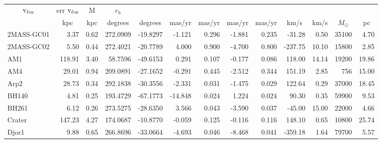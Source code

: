 \begin{longtable}{ | l | r | r| r | r | r | r | r | r | r | r | r | r  |}
            \multicolumn{1}{|c|}{$\rm v_{\ell os}$  } & 
            \multicolumn{1}{|c|}{err $\rm v_{\ell os}$} & 
            \multicolumn{1}{|c|}{M         } & 
            \multicolumn{1}{|c|}{$r_{h}$ } \\ 
            \multicolumn{1}{|c|}{}& 
            \multicolumn{1}{|c|}{kpc       } & 
            \multicolumn{1}{|c|}{kpc       } & 
            \multicolumn{1}{|c|}{degrees   } & 
            \multicolumn{1}{|c|}{degrees   } & 
            \multicolumn{1}{|c|}{mas/yr    } & 
            \multicolumn{1}{|c|}{mas/yr    } & 
            \multicolumn{1}{|c|}{mas/yr    } & 
            \multicolumn{1}{|c|}{mas/yr    } & 
            \multicolumn{1}{|c|}{km/s      } & 
            \multicolumn{1}{|c|}{km/s      } & 
            \multicolumn{1}{|c|}{$M_{\odot}$} & 
            \multicolumn{1}{|c|}{pc        } \\ 
            \hline
            \endhead
            \hline
            \endfoot
            2MASS-GC01    &   3.37 & 0.62 & 272.0909 & -19.8297 &  -1.121 & 0.296 &  -1.881 &  0.235 &  -31.28 &  0.50 &   35100 &  4.70\\ 
            2MASS-GC02    &   5.50 & 0.44 & 272.4021 & -20.7789 &   4.000 & 0.900 &  -4.700 &  0.800 & -237.75 & 10.10 &   15800 &  2.85\\ 
            AM1           & 118.91 & 3.40 &  58.7596 & -49.6153 &   0.291 & 0.107 &  -0.177 &  0.086 &  118.00 & 14.14 &   19200 & 19.86\\ 
            AM4           &  29.01 & 0.94 & 209.0891 & -27.1652 &  -0.291 & 0.445 &  -2.512 &  0.344 &  151.19 &  2.85 &     756 & 15.00\\ 
            Arp2          &  28.73 & 0.34 & 292.1838 & -30.3556 &  -2.331 & 0.031 &  -1.475 &  0.029 &  122.64 &  0.29 &   37000 & 18.45\\ 
            BH140         &   4.81 & 0.25 & 193.4729 & -67.1773 & -14.848 & 0.024 &   1.224 &  0.024 &   90.30 &  0.35 &   59900 &  9.53\\ 
            BH261         &   6.12 & 0.26 & 273.5275 & -28.6350 &   3.566 & 0.043 &  -3.590 &  0.037 &  -45.00 & 15.00 &   22000 &  4.66\\ 
            Crater        & 147.23 & 4.27 & 174.0687 & -10.8770 &  -0.059 & 0.125 &  -0.116 &  0.116 &  148.10 &  0.65 &   10800 & 25.74\\ 
            Djor1         &   9.88 & 0.65 & 266.8696 & -33.0664 &  -4.693 & 0.046 &  -8.468 &  0.041 & -359.18 &  1.64 &   79700 &  5.57\\ 

\end{longtable}
